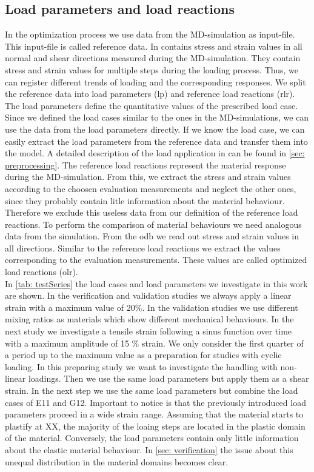     \subsection{Load parameters and load reactions}\label{subsec:loadParameters}
    In the optimization process we use data from the MD-simulation as input-file. This input-file is called reference data. In contains stress and strain values in all normal and shear directions measured during the MD-simulation. They contain stress and strain values for multiple steps during the loading process. Thus, we can register different trends of loading and the corresponding responses.
    We split the reference data into load parameters (lp) and reference load reactions (rlr). The load parameters define the quantitative values of the prescribed load case. 
    Since we defined the load cases similar to the ones in the MD-simulations, we can use the data from the load parameters directly.  If we know the load case, we can easily extract the load parameters from the reference data and transfer them into the  model. A detailed description of the load application in  can be found in \autoref{sec: preprocessing}. 
    The reference load reactions represent the material response during the MD-simulation. From this, we extract the stress and strain values according to the choosen evaluation measurements and neglect the other ones, since they probably contain litle information about the material behaviour. Therefore we exclude this useless data from our definition of the reference load reactions. 
    To perform the comparison of material behaviours we need analogous data from the  simulation. From the odb we read out stress and strain values in all directions. Similar to the reference load reactions we extract the values corresponding to the evaluation measurements. These values are called optimized load reactions (olr). \\
    In \autoref{tab: testSeries} the load cases and load parameters we investigate in this work are shown.
    In the verification and validation studies we always apply a linear strain with a maximum value of 20\%. In the validation studies we use different mixing ratios as materials which show different mechanical behaviours. In the next study we investigate a tensile strain following a sinus function over time with a maximum amplitude of 15 \(\%\) strain. We only consider the first quarter of a period up to the maximum value as a preparation for studies with cyclic loading. In this preparing study we want to investigate the handling with non-linear loadings. Then we use the same load parameters but apply them as a shear strain. In the next step we use the same load parameters but combine the load cases of E11 and G12. Important to notice is that the previously introduced load parameters proceed in a wide strain range. Assuming that the material starts to plastify at XX, the majority of the loaing steps are located in the plastic domain of the material. Conversely, the load parameters contain only little information about the elastic material behaviour. In \autoref{sec: verification} the issue about this unequal distribution in the material domains becomes clear.    
